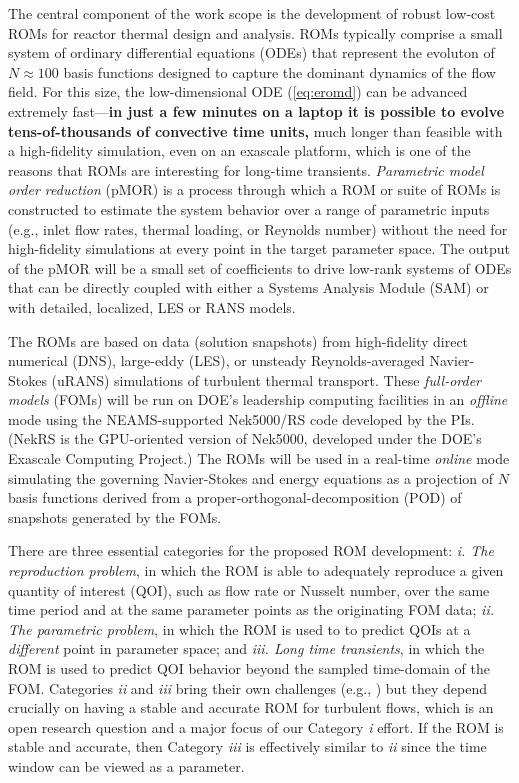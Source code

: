 
The central component of the work scope is the development of robust low-cost
ROMs for reactor thermal design and analysis.  ROMs typically comprise a small
system of ordinary differential equations (ODEs) that represent the evoluton of
$N \approx 100$ basis functions designed to capture the dominant dynamics of
the flow field.  For this size, the low-dimensional ODE (\ref{eq:eromd}) can
   be advanced extremely fast---\textbf{in just a few minutes on a laptop it is
   possible to evolve tens-of-thousands of convective time units,} much longer
   than feasible with a high-fidelity simulation, even on an exascale platform,
   which is one of the reasons that ROMs are interesting for long-time transients.  
{\em Parametric model order reduction} (pMOR) is a process through which
a ROM or suite of ROMs is constructed to estimate the system behavior 
over a range of parametric inputs (e.g., inlet flow rates, thermal loading,
or Reynolds number)
without the need for high-fidelity simulations at every point in the target
parameter space.  The output of the pMOR will be a small set of coefficients to
drive low-rank systems of ODEs that can be directly coupled with either a
Systems Analysis Module (SAM) or with detailed, localized, LES or RANS models.

The ROMs are based on data (solution snapshots) from high-fidelity direct
numerical (DNS), large-eddy (LES), or unsteady Reynolds-averaged Navier-Stokes
(uRANS) simulations of turbulent thermal transport.   These \textit{full-order
models} (FOMs) will be run on DOE's leadership computing facilities in an {\em
offline} mode using the NEAMS-supported Nek5000/RS code developed by the PIs.
(NekRS is the GPU-oriented version of Nek5000, developed under the DOE's
Exascale Computing Project.) The ROMs will be used in a real-time {\em online}
mode simulating the governing Navier-Stokes and energy equations as a
projection of $N$ basis functions derived from a
proper-orthogonal-decomposition (POD) of snapshots generated by the FOMs.

There are three essential categories for the proposed ROM development:
\textit{i. The reproduction problem}, in which the ROM is able to
adequately reproduce a given quantity of interest (QOI), such as
flow rate or Nusselt number, over the same time period and at the
same parameter points as the originating FOM data;
\textit{ii. The parametric problem}, in which the ROM is used to
to predict QOIs at a {\em different} point in parameter space;
and
\textit{iii. Long time transients}, in which the ROM is used to
predict QOI behavior beyond the sampled time-domain of the FOM.
Categories \textit{ii} and \textit{iii} bring their own challenges
(e.g., \cite{tsai22a}) but they depend crucially on having a 
stable and accurate ROM for turbulent flows, which is an open
research question and a major focus of our Category \textit{i} effort.
If the ROM is stable and accurate, then Category \textit{iii} is 
effectively similar to \textit{ii} since the time window can be
viewed as a parameter.


